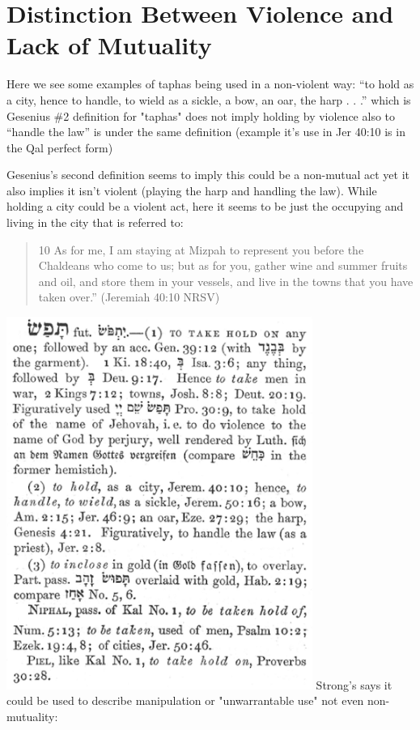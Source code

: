 \documentclass[11pt]{article}
\begin{document}
\section{Distinction Between Violence and Lack of Mutuality}
Here we see some examples of taphas being used in a non-violent way:
“to hold as a city, hence to handle, to wield as a sickle, a bow, an oar, the harp . . .” which is Gesenius \#2 definition for "taphas" does not imply holding by violence also to “handle the law” is under the same definition (example it's use in Jer 40:10 is in the Qal perfect form) 

Gesenius’s second definition seems to imply this could be a non-mutual act yet it also implies it isn't violent (playing the harp and handling the law). While holding a city could be a violent act, here it seems to be just the occupying and living in the city that is referred to:
\begin{quote}
10 As for me, I am staying at Mizpah to represent you before the Chaldeans who come to us; but as for you, gather wine and summer fruits and oil, and store them in your vessels, and live in the towns that you have taken over.” (Jeremiah 40:10 NRSV)
\end{quote}

\includegraphics[width=10cm]{taphas}
\newline
Strong’s says it could be used to describe manipulation or "unwarrantable use" not even non-mutuality:
\end{document}

